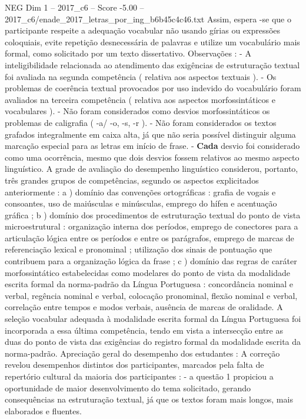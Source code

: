 \begin{textsample}{NEG Dim 1 – 2017\_c6 – Score -5.00 – 2017\_c6/enade\_2017\_letras\_por\_ing\_b6b45c4c46.txt}
Assim, espera -se que o participante respeite a adequação vocabular não usando gírias ou expressões coloquiais, evite repetição desnecessária de palavras e utilize um vocabulário mais formal, como solicitado por um texto dissertativo.
Observações : - A inteligibilidade relacionada ao atendimento das exigências de estruturação textual foi avaliada na segunda competência ( relativa aos aspectos textuais ). - Os problemas de coerência textual provocados por uso indevido do vocabulário foram avaliados na terceira competência ( relativa aos aspectos morfossintáticos e vocabulares ). - Não foram considerados como desvios morfossintáticos os problemas de caligrafia ( -a/ -o, -s, -r ). - Não foram considerados os textos grafados integralmente em caixa alta, já que não seria possível distinguir alguma marcação especial para as letras em início de frase. - \textbf{Cada} desvio foi considerado como uma ocorrência, mesmo que dois desvios fossem relativos ao mesmo aspecto linguístico.
A grade de avaliação do desempenho linguístico considerou, portanto, três grandes grupos de competências, segundo os aspectos explicitados anteriormente : a ) domínio das convenções ortográficas : grafia de vogais e consoantes, uso de maiúsculas e minúsculas, emprego do hífen e acentuação gráfica ; b ) domínio dos procedimentos de estruturação textual do ponto de vista microestrutural : organização interna dos períodos, emprego de conectores para a articulação lógica entre os períodos e entre os parágrafos, emprego de marcas de referenciação lexical e pronominal ; utilização dos sinais de pontuação que contribuem para a organização lógica da frase ; c ) domínio das regras de caráter morfossintático estabelecidas como modelares do ponto de vista da modalidade escrita formal da norma-padrão da Língua Portuguesa : concordância nominal e verbal, regência nominal e verbal, colocação pronominal, flexão nominal e verbal, correlação entre tempos e modos verbais, ausência de marcas de oralidade.
A seleção vocabular adequada à modalidade escrita formal da Língua Portuguesa foi incorporada a essa última competência, tendo em vista a intersecção entre as duas do ponto de vista das exigências do registro formal da modalidade escrita da norma-padrão.
Apreciação geral do desempenho dos estudantes : A correção revelou desempenhos distintos dos participantes, marcados pela falta de repertório cultural da maioria dos participantes : - a questão 1 propiciou a oportunidade de maior desenvolvimento do tema solicitado, gerando consequências na estruturação textual, já que os textos foram mais longos, mais elaborados e fluentes.

\end{textsample}
